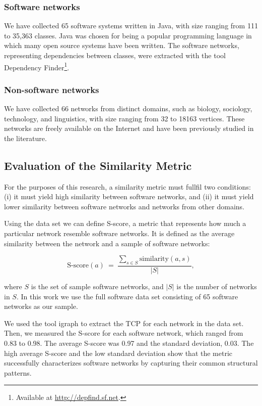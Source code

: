 \subsubsection{Software networks} We have collected 65 software systems written in
Java, with size ranging from 111 to 35,363 classes. Java was chosen for being a
popular programming language in which many open source systems have been
written. The software networks, representing dependencies between classes, were
extracted with the tool Dependency Finder\footnote{Available at
\url{http://depfind.sf.net}.}.

\subsubsection{Non-software networks} We have collected 66 networks from
distinct domains, such as biology, sociology, technology, and linguistics, with
size ranging from 32 to 18163 vertices. These networks are freely available on
the Internet and have been previously studied in the literature.

\subsection{Evaluation of the Similarity Metric}


For the purposes of this research, a similarity metric must fullfil two
conditions: (i) it must yield high similarity between software networks, and
(ii) it must yield lower similarity between software networks and networks from
other domains.

Using the data set we can define S-score, a metric that represents how much a
particular network resemble software networks. It is defined as the average
similarity between the network and a sample of software networks:

$$
\mathrm{S\mbox{-}score}(a) ~=~ \frac{
\displaystyle\sum_{s \in S} \mathrm{similarity}(a, s)
}{|S|} \mathrm{,}
$$

where $S$ is the set of sample software networks, and $|S|$ is the number of
networks in $S$. In this work we use the full software data set consisting of 65
software networks as our sample.

We used the tool igraph \cite{igraph} to extract the TCP for each network in the
data set. Then, we measured the S-score for each software network, which ranged
from 0.83 to 0.98. The average S-score was 0.97 and the standard deviation,
0.03. The high average S-score and the low standard deviation show that the
metric successfully characterizes software networks by capturing their common
structural patterns.

